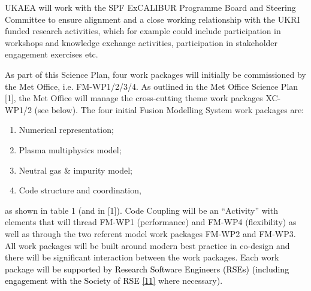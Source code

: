 \documentclass[a4paper]{article}
\newcommand\textstyleInternetlink[1]{\textcolor{blue}{#1}}
\newcommand\liststyleWWNumvi{%
\renewcommand\theenumi{\arabic{enumi}}
\renewcommand\theenumii{\alph{enumii}}
\renewcommand\theenumiii{\roman{enumiii}}
\renewcommand\theenumiv{\arabic{enumiv}}
\renewcommand\labelenumi{\theenumi.}
\renewcommand\labelenumii{\theenumii.}
\renewcommand\labelenumiii{\theenumiii.}
\renewcommand\labelenumiv{\theenumiv.}
}
\begin{document}
\bigskip

UKAEA will work with the SPF ExCALIBUR Programme Board and Steering Committee to ensure alignment and a close working
relationship with the UKRI funded research activities, which for example could include participation in workshops and
knowledge exchange activities, participation in stakeholder engagement exercises etc.


\bigskip

As part of this Science Plan, four work packages will initially be commissioned by the Met Office, i.e. FM-WP1/2/3/4. As
outlined in the Met Office Science Plan [1], the Met Office will manage the cross-cutting theme work packages XC-WP1/2
(see below). The four initial Fusion Modelling System work packages are:


\bigskip

\liststyleWWNumvi
\begin{enumerate}
\item Numerical representation;
\item Plasma multiphysics model;
\item Neutral gas \& impurity model;
\item Code structure and coordination,
\end{enumerate}

\bigskip

as shown in table 1 (and in [1]). Code Coupling will be an ``Activity'' with elements that will thread FM-WP1
(performance) and FM-WP4 (flexibility) as well as through the two referent model work packages FM-WP2 and FM-WP3. All
work packages will be built around modern best practice in co-design and there will be significant interaction between
the work packages. Each work package will \textcolor{black}{be supported by Research Software Engineers (RSEs)
(including engagement with the Society of RSE
}\href{https://society-rse.org/}{\textstyleInternetlink{\textcolor{black}{[11]}}} where necessary).


\bigskip


\bigskip
\end{document}
